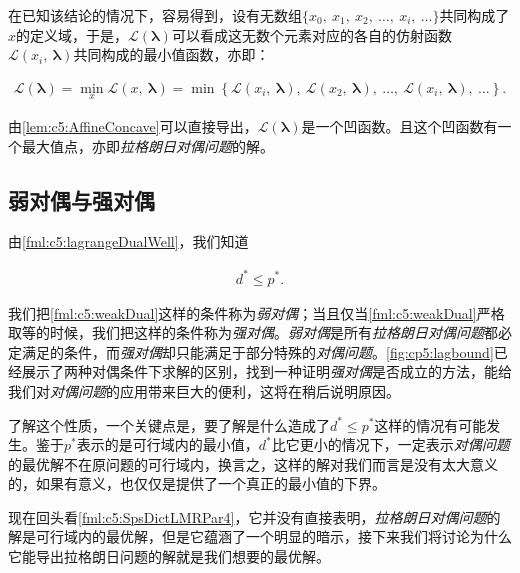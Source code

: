 在已知该结论的情况下，容易得到，设有无数组$\{x_0,~x_1,~x_2,~\ldots,~x_i,~\ldots\}$共同构成了$x$的定义域，于是，$\mathcal{L}(\bm{\lambda})$可以看成这无数个元素对应的各自的仿射函数$\mathcal{L}(x_i,~\bm{\lambda})$共同构成的最小值函数，亦即：

\begin{equation}\label{fml:c5:affineMin}
	\begin{aligned} 
		\mathcal{L}(\bm{\lambda}) = \min\limits_x\mathcal{L}(x,~\bm{\lambda}) = \min\left\{\mathcal{L}(x_i,~\bm{\lambda}),~\mathcal{L}(x_2,~\bm{\lambda}),~\ldots,~\mathcal{L}(x_i,~\bm{\lambda}),~\ldots\right\}.
	\end{aligned}
\end{equation}

由\autoref{lem:c5:AffineConcave}可以直接导出，$\mathcal{L}(\bm{\lambda})$是一个凹函数。且这个凹函数有一个最大值点，亦即\emph{拉格朗日对偶问题}的解。

\subsection{弱对偶与强对偶}

由\eqref{fml:c5:lagrangeDualWell}，我们知道

\begin{equation}\label{fml:c5:weakDual}
	\begin{aligned}
		d^{\ast} \leqslant p^{\ast}.
	\end{aligned}
\end{equation}

我们把\eqref{fml:c5:weakDual}这样的条件称为\emph{弱对偶}；当且仅当\eqref{fml:c5:weakDual}严格取等的时候，我们把这样的条件称为\emph{强对偶}。\emph{弱对偶}是所有\emph{拉格朗日对偶问题}都必定满足的条件，而\emph{强对偶}却只能满足于部分特殊的\emph{对偶问题}。\autoref{fig:cp5:lagbound}已经展示了两种对偶条件下求解的区别，找到一种证明\emph{强对偶}是否成立的方法，能给我们对\emph{对偶问题}的应用带来巨大的便利，这将在稍后说明原因。

了解这个性质，一个关键点是，要了解是什么造成了$d^{\ast} \leqslant p^{\ast}$这样的情况有可能发生。鉴于$p^{\ast}$表示的是可行域内的最小值，$d^{\ast}$比它更小的情况下，一定表示\emph{对偶问题}的最优解不在原问题的可行域内，换言之，这样的解对我们而言是没有太大意义的，如果有意义，也仅仅是提供了一个真正的最小值的下界。

现在回头看\eqref{fml:c5:SpsDictLMRPar4}，它并没有直接表明，\emph{拉格朗日对偶问题}的解是可行域内的最优解，但是它蕴涵了一个明显的暗示，接下来我们将讨论为什么它能导出拉格朗日问题的解就是我们想要的最优解。

